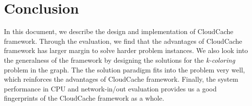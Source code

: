 \section{Conclusion}\label{sec:conclusion}
In this document, we describe the design and implementation of CloudCache framework. Through the evaluation, we find that the advantages of CloudCache framework has larger margin to solve harder problem instances. We also look into the generalness of the framework by designing the solutions for the \emph{k-coloring} problem in the graph. The the solution paradigm fits into the problem very well, which reinforces the advantages of CloudCache framework. Finally, the system performance in CPU and network-in/out evaluation provides us a good fingerprints of the CloudCache framework as a whole.
